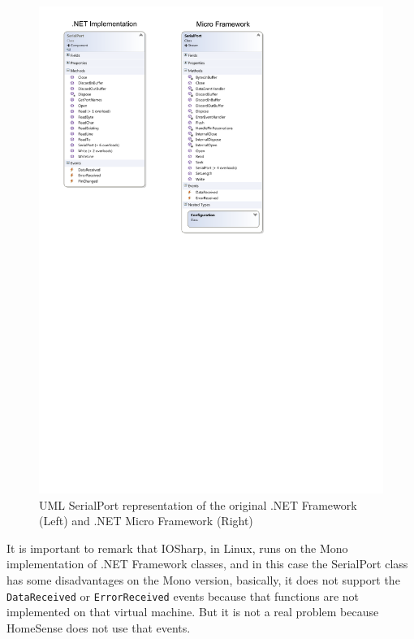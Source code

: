 \begin{figure}[H]\begin{center}
 \centering
  \captionsetup{justification=centering}
  \includegraphics[scale=1]{pictures/iosharp/serialport-uml}
  \caption{UML SerialPort representation of the original .NET Framework (Left) and .NET Micro Framework (Right)\label{fig:serialport-uml}}
\end{center}\end{figure}

It is important to remark that IOSharp, in Linux, runs on the Mono implementation of .NET Framework classes, and in this case the SerialPort class has some disadvantages on the Mono version, basically, it does not support the \verb!DataReceived! or \verb!ErrorReceived! events because that functions are not implemented on that virtual machine. But it is not a real problem because HomeSense does not use that events.

